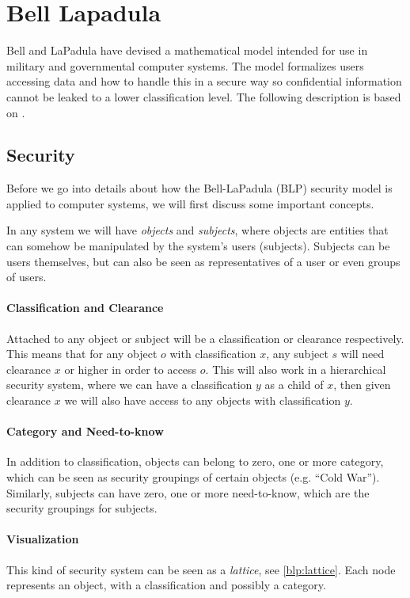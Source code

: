 \section{Bell Lapadula}

Bell and LaPadula have devised a mathematical model intended for use in  military and governmental computer systems.
The model formalizes users accessing data and how to handle this in a secure way so confidential information cannot be leaked to a lower classification level.
The following description is based on \citet{lapadula1996secure}.

\subsection{Security}
Before we go into details about how the Bell-LaPadula (BLP) security model is applied to computer systems, we will first discuss some important concepts.

In any system we will have \textit{objects} and \textit{subjects}, where objects are entities that can somehow be manipulated by the system's users (subjects).
Subjects can be users themselves, but can also be seen as representatives of a user or even groups of users.

\paragraph{Classification and Clearance}
Attached to any object or subject will be a classification or clearance respectively.
This means that for any object $o$ with classification $x$, any subject $s$ will need clearance $x$ or higher in order to access $o$.
This will also work in a hierarchical security system, where we can have a classification $y$ as a child of $x$, then given clearance $x$ we will also have access to any objects with classification $y$.

\paragraph{Category and Need-to-know}
In addition to classification, objects can belong to zero, one or more category, which can be seen as security groupings of certain objects (e.g. ``Cold War'').
Similarly, subjects can have zero, one or more need-to-know, which are the security groupings for subjects.

\paragraph{Visualization}
This kind of security system can be seen as a \textit{lattice}, see \cref{blp:lattice}.
Each node represents an object, with a classification and possibly a category.

